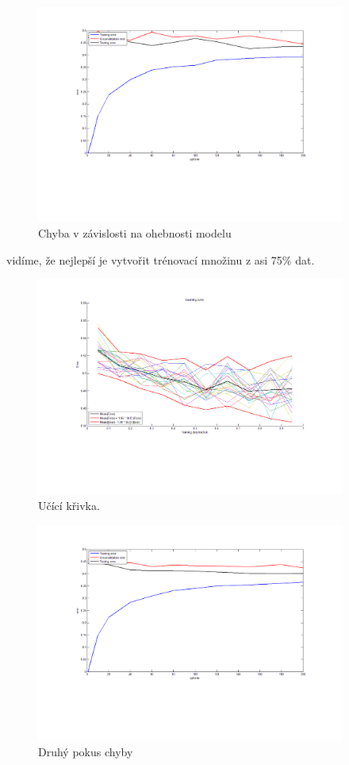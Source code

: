 \documentclass[journal]{IEEEtran}
\begin{document}
\begin{figure}[!h]
\begin{center}
\includegraphics[width=4in]{error.pdf}
\caption{Chyba v z\'{a}vislosti na ohebnosti modelu}
\end{center}\label{f-ac}
\end{figure}
 vid\'{i}me, \v{z}e nejlep\v{s}\'{i} je vytvo\v{r}it tr\'{e}novac\'{i} mno\v{z}inu z asi 75\% dat.


\begin{figure}[!h]
\begin{center}
\includegraphics[width=4in]{linearingcurve.pdf}
\caption{U\v{c}\'{i}c\'{i} k\v{r}ivka.}
\end{center}\label{f-ac}
\end{figure}

\begin{figure}[!h]
\begin{center}
\includegraphics[width=4in]{untitled.pdf}
\caption{Druh\'{y} pokus chyby}
\end{center}\label{f-ac}
\end{figure}
\end{document}
